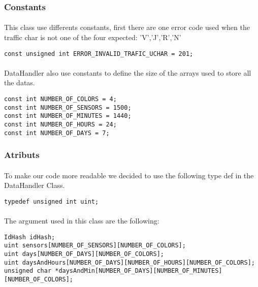 \documentclass[a4paper, 12pts]{article}
\begin{document}
\subsubsection{Constants}

\paragraph{}
	This class use differents constants, first there are one error code used when the traffic char is not one of the four expected: 'V','J','R','N'

\begin{lstlisting}
const unsigned int ERROR_INVALID_TRAFIC_UCHAR = 201;
\end{lstlisting}

\paragraph{}
	DataHandler also use constants to define the size of the arrays used to store all the datas.

\begin{lstlisting}
const int NUMBER_OF_COLORS = 4;
const int NUMBER_OF_SENSORS = 1500;
const int NUMBER_OF_MINUTES = 1440;
const int NUMBER_OF_HOURS = 24;
const int NUMBER_OF_DAYS = 7;
\end{lstlisting}

\subsubsection{Atributs}
\paragraph{}
	To make our code more readable we decided to use the following type def in the DataHandler Class.
\begin{lstlisting}
typedef unsigned int uint;
\end{lstlisting}

\paragraph{}
	The argument used in this class are the following:
\begin{lstlisting}
IdHash idHash;
uint sensors[NUMBER_OF_SENSORS][NUMBER_OF_COLORS];
uint days[NUMBER_OF_DAYS][NUMBER_OF_COLORS];
uint daysAndHours[NUMBER_OF_DAYS][NUMBER_OF_HOURS][NUMBER_OF_COLORS];
unsigned char *daysAndMin[NUMBER_OF_DAYS][NUMBER_OF_MINUTES][NUMBER_OF_COLORS];
\end{lstlisting}
\end{document}
